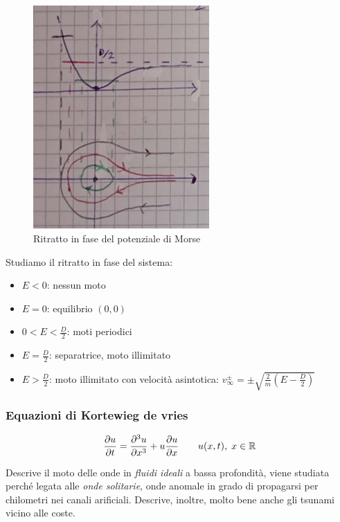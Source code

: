 \begin{figure}[ht]
    \centering
    \includegraphics[width=0.6\textwidth]{images/potenzialeMorse.png}
    \caption{Ritratto in fase del potenziale di Morse}
\end{figure}

Studiamo il ritratto in fase del sistema:

\begin{itemize}
    \item $E < 0$: nessun moto
    \item $E = 0$: equilibrio $(0,0)$
    \item $0 < E < \tfrac{D}{2}$: moti periodici
    \item $E = \tfrac{D}{2}$: separatrice, moto illimitato
    \item $E > \tfrac{D}{2}$: moto illimitato con velocità asintotica:  $v_{\infty}^{\pm} = \pm \sqrt{\frac{2}{m}\left(E - \frac{D}{2}\right)}$
\end{itemize}


\subsubsection{Equazioni di Kortewieg de vries}

\begin{equation}
    \pdv{u}{t}= \pdv[3]{u}{x}+ u\pdv{u}{x} \qquad u(x,t),\;x \in \mathbb{R}
\end{equation}

Descrive il moto delle onde in \textit{fluidi ideali} a bassa profondità, viene studiata perché legata alle \textit{onde solitarie}, 
onde anomale in grado di propagarsi per chilometri nei canali arificiali. Descrive, inoltre, molto bene anche gli tsunami vicino alle coste.

